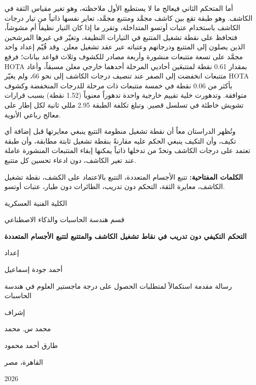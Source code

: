 \documentclass[12pt,a4paper]{article}
\newcommand{\ArabicTitle}{التحكم التكيفي دون تدريب في نقاط تشغيل الكاشف والمتتبع لتتبع الأجسام المتعددة}
\newcommand{\ArabicAuthor}{أحمد جودة إسماعيل}
\newcommand{\ArabicSupervisorOne}{محمد س. محمد}
\newcommand{\ArabicSupervisorTwo}{طارق أحمد محمود}
\newcommand{\ArabicDegree}{رسالة مقدمة استكمالاً لمتطلبات الحصول على درجة ماجستير العلوم في هندسة الحاسبات}
\newcommand{\ArabicDepartment}{قسم هندسة الحاسبات والذكاء الاصطناعي}
\newcommand{\ArabicInstitution}{الكلية الفنية العسكرية}
\newcommand{\ArabicCity}{القاهرة، مصر}
\begin{document}
\begin{otherlanguage}{arabic}
أما المتحكم الثاني فيعالج ما لا يستطيع الأول ملاحظته، وهو تغير مقياس الثقة في الكاشف. وهو طبقة تقع بين كاشف مجمَّد ومتتبع مجمَّد، تعاير نفسها ذاتياً من تيار درجات الكاشف باستخدام عتبات أوتسو المتداخلة، وتقرر ما إذا كان التيار نظيفاً أم مشوشاً، فتحافظ على نقطة تشغيل المتتبع في التيارات النظيفة، وتغيّر في غيرها المرشحين الذين يصلون إلى المتتبع ودرجاتهم وعتباته عبر عقد تشغيل معلن. وقد قُيّم إعداد واحد مجمَّد على تسعة متتبعات منشورة وأربعة مصادر للكشوف وثلاث قواعد بيانات؛ فرفع \foreignlanguage{english}{HOTA} بمقدار \foreignlanguage{english}{0.61} نقطة لمتتبعَين أحاديي المرحلة أحدهما خارجي معلن مسبقاً، وأعاد متتبعات انخفضت إلى الصفر عند تنصيف درجات الكاشف إلى نحو 66، ولم يغيّر \foreignlanguage{english}{HOTA} بأكثر من \foreignlanguage{english}{0.06} نقطة في خمسة متتبعات ذات مرحلة للدرجات المنخفضة وكشوف متوافقة. وتدهورت خلية تقييم خارجية واحدة تدهوراً معنوياً (\foreignlanguage{english}{1.52} نقطة) بسبب قرارات تشويش خاطئة في تسلسل قصير. وتبلغ تكلفة الطبقة \foreignlanguage{english}{2.95} مللي ثانية لكل إطار على معالج رباعي الأنوية.

وتُظهر الدراستان معاً أن نقطة تشغيل منظومة التتبع ينبغي معايرتها قبل إضافة أي تكيف، وأن التكيف ينبغي الحكم عليه مقارنةً بنقطة تشغيل ثابتة مطابقة، وأن طبقة تعتمد على درجات الكاشف وتحدّ من تدخلها ذاتياً يمكنها إبقاء المتتبعات المنشورة عاملة عند تغير الكاشف، دون ادعاء تحسين كل متتبع.

\vspace{0.5cm}
\noindent\textbf{الكلمات المفتاحية:} تتبع الأجسام المتعددة، التتبع بالاعتماد على الكشف، نقطة تشغيل الكاشف، معايرة الثقة، التحكم دون تدريب، الطائرات دون طيار، عتبات أوتسو.

\clearpage
\thispagestyle{empty}
\begin{center}
{\large \ArabicInstitution\par}
{\normalsize \ArabicDepartment\par}
\vspace{2.5cm}
{\LARGE\bfseries \ArabicTitle\par}
\vspace{2cm}
{\normalsize إعداد\par}
\vspace{0.3cm}
{\Large \ArabicAuthor\par}
\vspace{2cm}
{\normalsize \ArabicDegree\par}
\vspace{2cm}
{\normalsize إشراف\par}
\vspace{0.4cm}
{\large \ArabicSupervisorOne\par}
\vspace{0.3cm}
{\large \ArabicSupervisorTwo\par}
\vfill
{\normalsize \ArabicCity\par}
{\normalsize \foreignlanguage{english}{2026}\par}
\end{center}
\end{otherlanguage}
\end{document}
